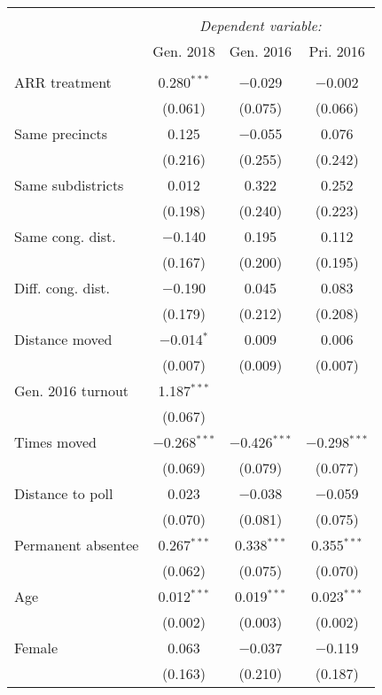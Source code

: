 
\begin{tabular}{@{\extracolsep{5pt}}lccc} 
\\[-1.8ex]\hline 
\hline \\[-1.8ex] 
 & \multicolumn{3}{c}{\textit{Dependent variable:}} \\ 
\cline{2-4} 
 & Gen. 2018 & Gen. 2016 & Pri. 2016 \\ 
\hline \\[-1.8ex] 
 ARR treatment & 0.280$^{***}$ & $-$0.029 & $-$0.002 \\ 
  & (0.061) & (0.075) & (0.066) \\ 
  Same precincts & 0.125 & $-$0.055 & 0.076 \\ 
  & (0.216) & (0.255) & (0.242) \\ 
  Same subdistricts & 0.012 & 0.322 & 0.252 \\ 
  & (0.198) & (0.240) & (0.223) \\ 
  Same cong. dist. & $-$0.140 & 0.195 & 0.112 \\ 
  & (0.167) & (0.200) & (0.195) \\ 
  Diff. cong. dist. & $-$0.190 & 0.045 & 0.083 \\ 
  & (0.179) & (0.212) & (0.208) \\ 
  Distance moved & $-$0.014$^{*}$ & 0.009 & 0.006 \\ 
  & (0.007) & (0.009) & (0.007) \\ 
  Gen. 2016 turnout & 1.187$^{***}$ &  &  \\ 
  & (0.067) &  &  \\ 
  Times moved & $-$0.268$^{***}$ & $-$0.426$^{***}$ & $-$0.298$^{***}$ \\ 
  & (0.069) & (0.079) & (0.077) \\ 
  Distance to poll & 0.023 & $-$0.038 & $-$0.059 \\ 
  & (0.070) & (0.081) & (0.075) \\ 
  Permanent absentee & 0.267$^{***}$ & 0.338$^{***}$ & 0.355$^{***}$ \\ 
  & (0.062) & (0.075) & (0.070) \\ 
  Age & 0.012$^{***}$ & 0.019$^{***}$ & 0.023$^{***}$ \\ 
  & (0.002) & (0.003) & (0.002) \\ 
  Female & 0.063 & $-$0.037 & $-$0.119 \\ 
  & (0.163) & (0.210) & (0.187) \\ 

\end{tabular}
